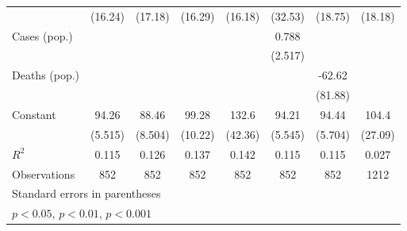 \documentclass{article}
\begin{document}
{\begin{longtable}{l*{7}{c}}
                &  (16.24)         &  (17.18)         &  (16.29)         &  (16.18)         &  (32.53)         &  (18.75)         &  (18.18)         \\
Cases (pop.)    &                  &                  &                  &                  &    0.788         &                  &                  \\
                &                  &                  &                  &                  &  (2.517)         &                  &                  \\
Deaths (pop.)   &                  &                  &                  &                  &                  &   -62.62         &                  \\
                &                  &                  &                  &                  &                  &  (81.88)         &                  \\
Constant        &    94.26\sym{***}&    88.46\sym{***}&    99.28\sym{***}&    132.6\sym{*}  &    94.21\sym{***}&    94.44\sym{***}&    104.4\sym{*}  \\
                &  (5.515)         &  (8.504)         &  (10.22)         &  (42.36)         &  (5.545)         &  (5.704)         &  (27.09)         \\
\hline
\(R^{2}\)       &    0.115         &    0.126         &    0.137         &    0.142         &    0.115         &    0.115         &    0.027         \\
Observations    &      852         &      852         &      852         &      852         &      852         &      852         &     1212         \\
\hline\hline
\multicolumn{8}{l}{\footnotesize Standard errors in parentheses}\\
\multicolumn{8}{l}{\footnotesize \sym{*} \(p<0.05\), \sym{**} \(p<0.01\), \sym{***} \(p<0.001\)}\\
\end{longtable}
}
\end{document}
